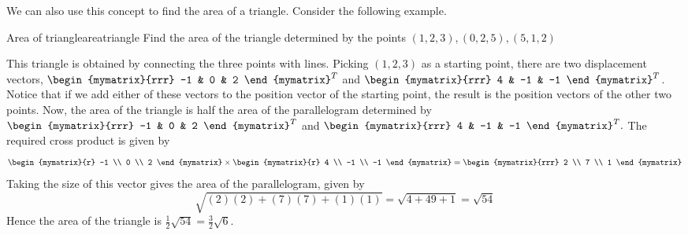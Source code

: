 We can also use this concept to find the area of a triangle. Consider the following
example.

\begin{example}{Area of triangle}{areatriangle}
Find the area of the triangle determined by the points $\left(1, 2, 3 \right) ,
\left( 0,2,5\right),
\left( 5,1, 2 \right) $ 
\end{example}

\begin{solution}
This triangle is obtained by connecting the three points with lines. Picking
$\left( 1,2,3\right) $ as a starting point, there are two displacement
vectors, $\begin{mymatrix}{rrr}
-1 & 0 & 2
\end{mymatrix}^T $ and $\begin{mymatrix}{rrr}
4 & -1 & -1
\end{mymatrix}^T $. Notice that if we add either of these vectors to the position vector of the 
starting point, the result is the position vectors of the other two
points. Now, the area of the triangle is half the area of the parallelogram
determined by $\begin{mymatrix}{rrr}
-1 & 0 & 2
\end{mymatrix}^T $ and $\begin{mymatrix}{rrr}
4 & -1 & -1
\end{mymatrix}^T.$ 
The required cross product is given by
\begin{equation*}
\begin{mymatrix}{r}
-1 \\
0 \\
2
\end{mymatrix} \times \begin{mymatrix}{r}
4 \\
-1 \\
-1
\end{mymatrix} = \begin{mymatrix}{rrr}
2 \\ 7 \\ 1
\end{mymatrix} 
\end{equation*}
  Taking the size of this vector gives the area of the parallelogram,
given by 
\begin{equation*}
\sqrt{(2)(2) + (7)(7) + (1)(1)}
=
\sqrt{4+49+1}
= \sqrt{54}
\end{equation*}
Hence the area of the triangle is $\frac{1}{2}\sqrt{54}= \frac{3}{2}\sqrt{6}.$
\end{solution}

